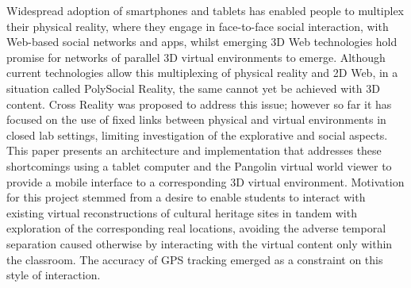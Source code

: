 Widespread adoption of smartphones and tablets has enabled people to multiplex their physical reality, where they engage in face-to-face social interaction, with Web-based social networks and apps, whilst emerging 3D Web technologies hold promise for networks of parallel 3D virtual environments to emerge. Although current technologies allow this multiplexing of physical reality and 2D Web, in a situation called PolySocial Reality, the same cannot yet be achieved with 3D content. Cross Reality was proposed to address this issue; however so far it has focused on the use of fixed links between physical and virtual environments in closed lab settings, limiting investigation of the explorative and social aspects. This paper presents an architecture and implementation that addresses these shortcomings using a tablet computer and the Pangolin virtual world viewer to provide a mobile interface to a corresponding 3D virtual environment. Motivation for this project stemmed from a desire to enable students to interact with existing virtual reconstructions of cultural heritage sites in tandem with exploration of the corresponding real locations, avoiding the adverse temporal separation caused otherwise by interacting with the virtual content only within the classroom. The accuracy of GPS tracking emerged as a constraint on this style of interaction.

